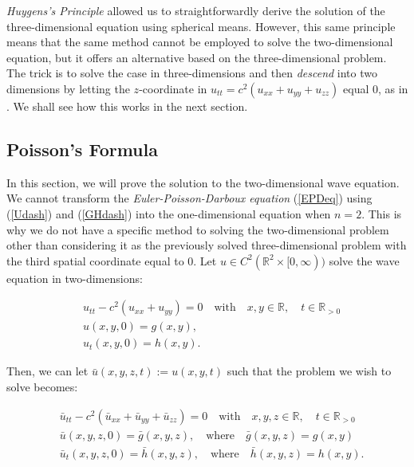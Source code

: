 \documentclass[a4paper, 12pt]{article}
\numberwithin{equation}{section}
\begin{document}
\emph{Huygens's Principle} allowed us to straightforwardly derive the solution
of the three-dimensional equation using spherical means. However, this same
principle means that the same method cannot be employed to solve the
two-dimensional equation, but it offers an alternative based on the
three-dimensional problem. The trick is to solve the case in three-dimensions
and then \emph{descend} into two dimensions by letting the $z$-coordinate in
$u_{tt}=c^2(u_{xx}+u_{yy}+u_{zz})$ equal $0$, as in \cite{Ev}. We shall see how
this works in the next section. 

\subsection{Poisson's Formula}

In this section, we will prove the solution to the two-dimensional wave
equation. We cannot transform the \emph{Euler-Poisson-Darboux equation}
(\ref{EPDeq}) using (\ref{Udash}) and (\ref{GHdash}) into the one-dimensional
equation when $n=2$. This is why we do not have a specific method to solving the
two-dimensional problem other than considering it as the previously solved
three-dimensional problem with the third spatial coordinate equal to $0$. Let $u
\in C^2(\mathbb{R}^2 \times [0, \infty))$ solve the wave equation in
two-dimensions:

\begin{equation} \label{2d}
    \begin{aligned}
        &u_{tt}-c^2(u_{xx}+u_{yy})=0 \quad \textrm{with} \quad x,y \in \mathbb{R}, \quad t\in \mathbb{R}_{>0}\\
        &u(x, y, 0)=g(x,y),\\
        &u_t(x,y,0)=h(x,y).
    \end{aligned}
\end{equation}

Then, we can let $\bar{u}(x, y, z, t):=u(x, y, t)$ such that the problem we wish
to solve becomes:

\begin{equation} \label{2das3d}
    \begin{aligned}
        &\bar{u}_{tt}-c^2(\bar{u}_{xx}+\bar{u}_{yy}+\bar{u}_{zz})=0 \quad \textrm{with} \quad x,y,z \in \mathbb{R}, \quad t\in \mathbb{R}_{>0}\\
        &\bar{u}(x, y, z, 0)=\bar{g}(x,y,z), \quad \textrm{where} \quad \bar{g}(x,y,z)=g(x,y)\\
        &\bar{u}_t(x,y,z,0)=\bar{h}(x,y,z), \quad \textrm{where} \quad \bar{h}(x,y,z)=h(x,y).
    \end{aligned}
\end{equation}
\end{document}
